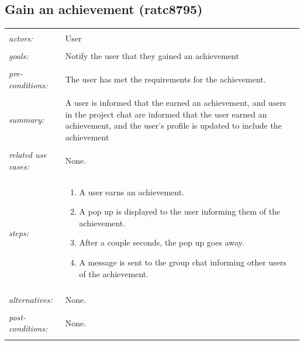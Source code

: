 \documentclass[11pt]{report}
\begin{document}
\begin{IDE-like Features}
\begin{}
\begin{Collaborative features that would be "nice":}
\subsection{Gain an achievement (ratc8795)}
\begin{tabular}{ p{2cm} p{12cm} }
 \hline
 \\
 \textit{actors:} & User \\ 
 \\
 \textit{goals:} & Notify the user that they gained an achievement \\
 \\
 \textit{pre-conditions:} & The user has met the requirements for the achievement. \\
 \\
 \textit{summary:} & A user is informed that the earned an achievement, and users in the project chat are informed that the user earned an achievement, and the user's profile is updated to include the achievement \\ 
 \\
 \textit{related use cases:} & None. \\ 
 \\
 \textit{steps:} & \begin{enumerate}
  \item A user earns an achievement.
  \item A pop up is displayed to the user informing them of the achievement.
  \item After a couple seconds, the pop up goes away.
  \item A message is sent to the group chat informing other users of the achievement.
 \end{enumerate} \\
 \\
 \textit{alternatives:} & None. \\
 \\
 \textit{post-conditions:} & None. \\
 \\
\hline
\end{tabular}


\end{Collaborative features that would be "nice":}
\end{}
\end{IDE-like Features}
\end{document}
